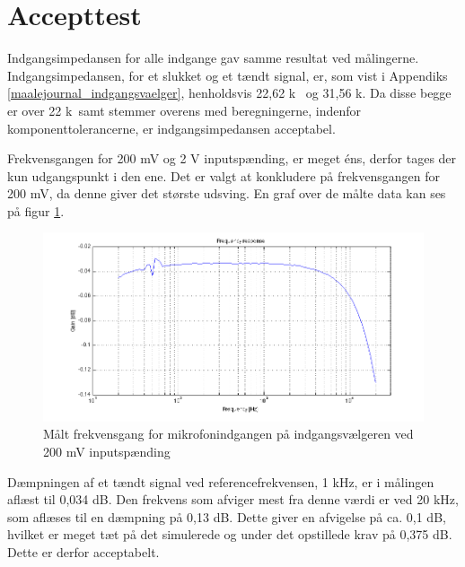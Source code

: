 \section{Accepttest}
Indgangsimpedansen for alle indgange gav samme resultat ved målingerne. Indgangsimpedansen, for et slukket og et tændt signal, er, som vist i Appendiks \ref{maalejournal_indgangsvaelger}, henholdsvis 22,62 k\ohm~ og 31,56 k\ohm . Da disse begge er over 22 k\ohm~samt stemmer overens med beregningerne, indenfor komponenttolerancerne, er indgangsimpedansen acceptabel.

Frekvensgangen for 200 mV og 2 V inputspænding, er meget éns, derfor tages der kun udgangspunkt i den ene. Det er valgt at konkludere på frekvensgangen for 200 mV, da denne giver det største udsving. En graf over de målte data kan ses på figur \ref{fig:indacc:frek200mv}.
\begin{figure}[h]
\centering
\includegraphics[width=\textwidth]{maalerapporter/indgangsvaelger/Indgangsvlger-mic-200mv-frek.png}
\caption{Målt frekvensgang for mikrofonindgangen på indgangsvælgeren ved 200 mV inputspænding}
\label{fig:indacc:frek200mv}
\end{figure}

Dæmpningen af et tændt signal ved referencefrekvensen, 1 kHz, er i målingen aflæst til 0,034 dB. Den frekvens som afviger mest fra denne værdi er ved 20 kHz, som aflæses til en dæmpning på 0,13 dB. Dette giver en afvigelse på ca. 0,1 dB, hvilket er meget tæt på det simulerede og under det opstillede krav på 0,375 dB. Dette er derfor acceptabelt.

